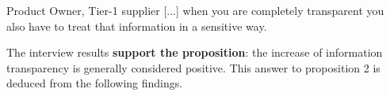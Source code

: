 \begin{aquote}{Product Owner, Tier-1 supplier}
 [...] when you are completely transparent you also have to treat that information in a sensitive way.
\end{aquote}

The interview results {\bf support the proposition}: the increase of information transparency is generally considered positive. This answer to proposition 2 is deduced from the following findings.

%
%
%
%
%
%
%
%


